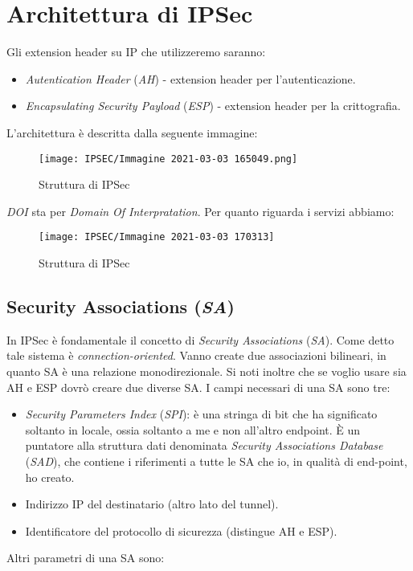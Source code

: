 \documentclass[14pt]{extreport}
\begin{document}
\section{Architettura di IPSec}

Gli extension header su IP che utilizzeremo saranno:

\begin{itemize}
    \item \textit{Autentication Header} (\textit{AH}) - extension header per l'autenticazione.
    
    \item \textit{Encapsulating Security Payload} (\textit{ESP}) - extension header per la crittografia.
\end{itemize}

L'architettura è descritta dalla seguente immagine:


\begin{figure}[H]
    \centering
    \texttt{[image: IPSEC/Immagine 2021-03-03 165049.png]}
    \caption{Struttura di IPSec}
    \label{IPSEC1}
\end{figure}

\textit{DOI} sta per \textit{Domain Of Interpratation}.
Per quanto riguarda i servizi abbiamo:

\begin{figure}[H]
    \centering
    \texttt{[image: IPSEC/Immagine 2021-03-03 170313]}
    \caption{Struttura di IPSec}
    \label{IPSEC2}
\end{figure}

\subsection{Security Associations (\textit{SA})}

In IPSec è fondamentale il concetto di \textit{Security Associations} (\textit{SA}). Come detto tale sistema è \textit{connection-oriented}. Vanno create due associazioni bilineari, in quanto SA è una relazione monodirezionale. Si noti inoltre che se voglio usare sia AH e ESP dovrò creare due diverse SA.
I campi necessari di una SA sono tre:

\begin{itemize}
    \item \textit{Security Parameters Index} (\textit{SPI}): è una stringa di bit che ha significato soltanto in locale, ossia soltanto a me e non all'altro endpoint. È un puntatore alla struttura dati denominata \textit{Security Associations Database} (\textit{SAD}), che contiene i riferimenti a tutte le SA che io, in qualità di end-point, ho creato.
    
    \item Indirizzo IP del destinatario (altro lato del tunnel).
    
    \item Identificatore del protocollo di sicurezza (distingue AH e ESP).
\end{itemize}
Altri parametri di una SA sono:
\end{document}
